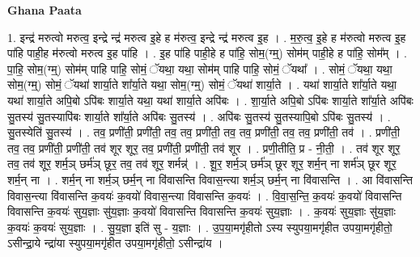 \documentclass[17pt]{extarticle}
\begin{document}
\textbf{Ghana Paata } \newline

1. इन्द्र॑ मरुत्वो मरुत्व॒ इन्द्रे न्द्र॑ मरुत्व इ॒हे ह म॑रुत्व॒ इन्द्रे न्द्र॑ मरुत्व इ॒ह । . म॒रु॒त्व॒ इ॒हे ह म॑रुत्वो मरुत्व इ॒ह पा॑हि पाही॒ह म॑रुत्वो मरुत्व इ॒ह पा॑हि । . इ॒ह पा॑हि पाही॒हे ह पा॑हि॒ सोम॒(ग्म्॒) सोम॑म् पाही॒हे ह पा॑हि॒ सोम᳚म् । . पा॒हि॒ सोम॒(ग्म्॒) सोम॑म् पाहि पाहि॒ सोमं॒ ॅयथा॒ यथा॒ सोम॑म् पाहि पाहि॒ सोमं॒ ॅयथा᳚ । . सोमं॒ ॅयथा॒ यथा॒ सोम॒(ग्म्॒) सोमं॒ ॅयथा॑ शार्या॒ते शा᳚र्या॒ते यथा॒ सोम॒(ग्म्॒) सोमं॒ ॅयथा॑ शार्या॒ते । . यथा॑ शार्या॒ते शा᳚र्या॒ते यथा॒ यथा॑ शार्या॒ते अपि॒बो ऽपि॑बः शार्या॒ते यथा॒ यथा॑ शार्या॒ते अपि॑बः । . शा॒र्या॒ते अपि॒बो ऽपि॑बः शार्या॒ते शा᳚र्या॒ते अपि॑बः सु॒तस्य॑ सु॒तस्यापि॑बः शार्या॒ते शा᳚र्या॒ते अपि॑बः सु॒तस्य॑ । . अपि॑बः सु॒तस्य॑ सु॒तस्यापि॒बो ऽपि॑बः सु॒तस्य॑ । . सु॒तस्येति॑ सु॒तस्य॑ । . तव॒ प्रणी॑ती॒ प्रणी॑ती॒ तव॒ तव॒ प्रणी॑ती॒ तव॒ तव॒ प्रणी॑ती॒ तव॒ तव॒ प्रणी॑ती॒ तव॑ । . प्रणी॑ती॒ तव॒ तव॒ प्रणी॑ती॒ प्रणी॑ती॒ तव॑ शूर शूर॒ तव॒ प्रणी॑ती॒ प्रणी॑ती॒ तव॑ शूर । . प्रणी॒तीति॒ प्र - नी॒ती॒ । . तव॑ शूर शूर॒ तव॒ तव॑ शूर॒ शर्म॒ञ् छर्म॑ञ् छूर॒ तव॒ तव॑ शूर॒ शर्मन्न्॑ । . शू॒र॒ शर्म॒ञ् छर्म॑ञ् छूर शूर॒ शर्म॒न् ना शर्म॑ञ् छूर शूर॒ शर्म॒न् ना । . शर्म॒न् ना शर्म॒ञ् छर्म॒न् ना वि॑वासन्ति विवास॒न्त्या शर्म॒ञ् छर्म॒न् ना वि॑वासन्ति । . आ वि॑वासन्ति विवास॒न्त्या वि॑वासन्ति क॒वयः॑ क॒वयो॑ विवास॒न्त्या वि॑वासन्ति क॒वयः॑ । . वि॒वा॒स॒न्ति॒ क॒वयः॑ क॒वयो॑ विवासन्ति विवासन्ति क॒वयः॑ सुय॒ज्ञाः सु॑य॒ज्ञाः क॒वयो॑ विवासन्ति विवासन्ति क॒वयः॑ सुय॒ज्ञाः । . क॒वयः॑ सुय॒ज्ञाः सु॑य॒ज्ञाः क॒वयः॑ क॒वयः॑ सुय॒ज्ञाः । . सु॒य॒ज्ञा इति॑ सु - य॒ज्ञाः । . उ॒प॒या॒मगृ॑हीतो ऽस्य स्युपया॒मगृ॑हीत उपया॒मगृ॑हीतो॒ ऽसीन्द्रा॒ये न्द्रा॑या स्युपया॒मगृ॑हीत उपया॒मगृ॑हीतो॒ ऽसीन्द्रा॑य । \newline
\end{document}
